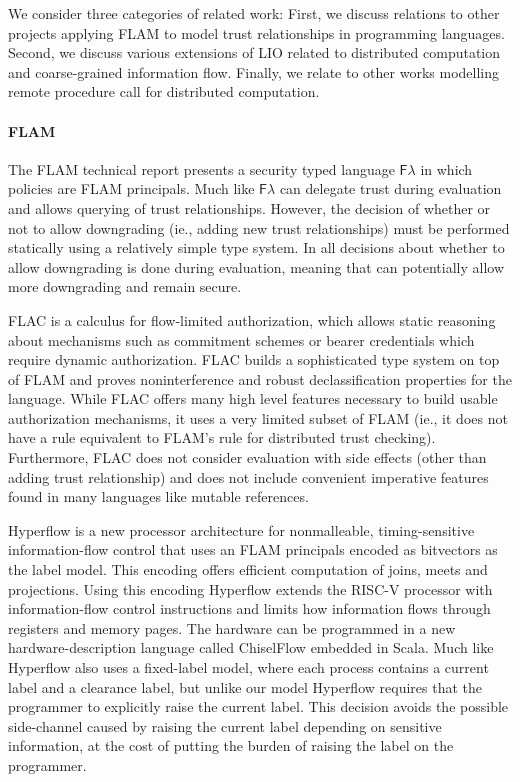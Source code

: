 We consider three categories of related work: First, we discuss relations to other projects applying FLAM to model trust relationships in programming languages. Second, we discuss various extensions of LIO related to distributed computation and coarse-grained information flow. Finally, we relate \lang{} to other works modelling remote procedure call for distributed computation.

\paragraph{FLAM}
The FLAM technical report \cite{flamtr} presents a security typed language $\mathsf{F}\lambda$ in which policies are FLAM principals. Much like \lang{} $\mathsf{F}\lambda$ can delegate trust during evaluation and allows querying of trust relationships. However, the decision of whether or not to allow downgrading (ie., adding new trust relationships) must be performed statically using a relatively simple type system. In \lang{} all decisions about whether to allow downgrading is done during evaluation, meaning that \lang{} can potentially allow more downgrading and remain secure.

FLAC \cite{7536372} is a calculus for flow-limited authorization, which allows static reasoning about mechanisms such as commitment schemes or bearer credentials which require dynamic authorization. FLAC builds a sophisticated type system on top of FLAM and proves noninterference and robust declassification properties for the language. While FLAC offers many high level features necessary to build usable authorization mechanisms, it uses a very limited subset of FLAM (ie., it does not have a rule equivalent to FLAM's  rule for distributed trust checking). Furthermore, FLAC does not consider evaluation with side effects (other than adding trust relationship) and does not include convenient imperative features found in many languages like mutable references.

Hyperflow \cite{hyperflow} is a new processor architecture for nonmalleable, timing-sensitive information-flow control that uses an FLAM principals encoded as bitvectors as the label model. This encoding offers efficient computation of joins, meets and projections. Using this encoding Hyperflow extends the RISC-V processor with information-flow control instructions and limits how information flows through registers and memory pages. The hardware can be programmed in a new hardware-description language called ChiselFlow embedded in Scala. Much like \lang{} Hyperflow also uses a fixed-label model, where each process contains a current label and a clearance label, but unlike our model Hyperflow requires that the programmer to explicitly raise the current label. This decision avoids the possible side-channel caused by raising the current label depending on sensitive information, at the cost of putting the burden of raising the label on the programmer.

